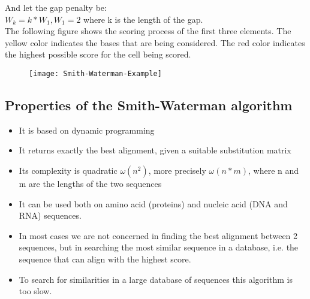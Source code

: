And let the gap penalty be: \\

$W_k = k*W_1, W_1 = 2$ where k is the length of the gap. \\

The following figure shows the scoring process of the first three elements. 
The yellow color indicates the bases that are being considered. 
The red color indicates the highest possible score for the cell being scored.

\begin{figure}[H]
  \centering
  \texttt{[image: Smith-Waterman-Example]}
\end{figure}

\subsection{Properties of the Smith-Waterman algorithm}

\begin{itemize}
	\item It is based on dynamic programming
	\item It returns exactly the best alignment, given a suitable substitution
 matrix
	\item Its complexity is quadratic $\omega(n^2)$, more precisely 
$\omega(n*m)$, where n and m are the lengths of the two sequences
	\item It can be used both on amino acid (proteins) and nucleic acid 
(DNA and RNA) sequences.
	\item In most cases we are not concerned in finding the best alignment 
between 2 sequences, but in searching the most similar sequence in a database, 
i.e. the sequence that can align with the highest score.
	\item To search for similarities in a large database of sequences this 
algorithm is too slow.
\end{itemize}
